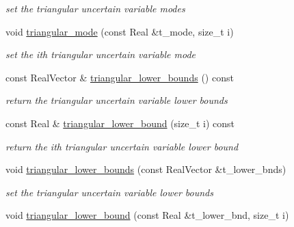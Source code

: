 \begin{DoxyCompactItemize}
\begin{DoxyCompactList}\small\item\em set the triangular uncertain variable modes \end{DoxyCompactList}\item 
void \hyperlink{classPecos_1_1AleatoryDistParams_ac1835284e197cd1f42ab8bd7e7763041}{triangular\+\_\+mode} (const Real \&t\+\_\+mode, size\+\_\+t i)\label{classPecos_1_1AleatoryDistParams_ac1835284e197cd1f42ab8bd7e7763041}

\begin{DoxyCompactList}\small\item\em set the ith triangular uncertain variable mode \end{DoxyCompactList}\item 
const Real\+Vector \& \hyperlink{classPecos_1_1AleatoryDistParams_a842478a841cdecc0da1e14b424fef954}{triangular\+\_\+lower\+\_\+bounds} () const \label{classPecos_1_1AleatoryDistParams_a842478a841cdecc0da1e14b424fef954}

\begin{DoxyCompactList}\small\item\em return the triangular uncertain variable lower bounds \end{DoxyCompactList}\item 
const Real \& \hyperlink{classPecos_1_1AleatoryDistParams_ad3ecd6d952f9b2faf5e0c3c5d7d43b10}{triangular\+\_\+lower\+\_\+bound} (size\+\_\+t i) const \label{classPecos_1_1AleatoryDistParams_ad3ecd6d952f9b2faf5e0c3c5d7d43b10}

\begin{DoxyCompactList}\small\item\em return the ith triangular uncertain variable lower bound \end{DoxyCompactList}\item 
void \hyperlink{classPecos_1_1AleatoryDistParams_a28723addfbfa28e64c698b96381248f1}{triangular\+\_\+lower\+\_\+bounds} (const Real\+Vector \&t\+\_\+lower\+\_\+bnds)\label{classPecos_1_1AleatoryDistParams_a28723addfbfa28e64c698b96381248f1}

\begin{DoxyCompactList}\small\item\em set the triangular uncertain variable lower bounds \end{DoxyCompactList}\item 
void \hyperlink{classPecos_1_1AleatoryDistParams_af66a04cb6ade2a1dc3249aab853db6b4}{triangular\+\_\+lower\+\_\+bound} (const Real \&t\+\_\+lower\+\_\+bnd, size\+\_\+t i)\label{classPecos_1_1AleatoryDistParams_af66a04cb6ade2a1dc3249aab853db6b4}


\end{DoxyCompactItemize}
